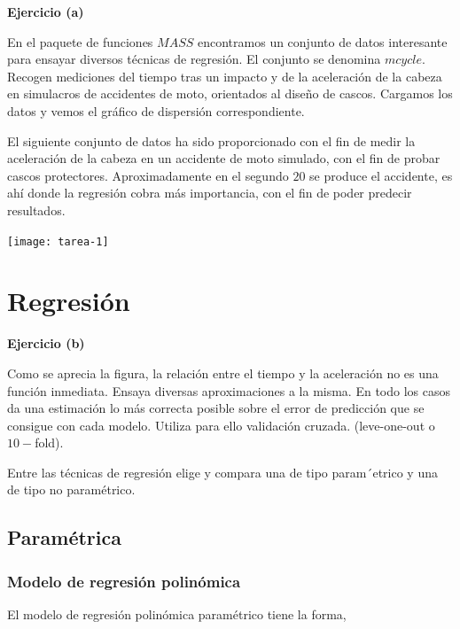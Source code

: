 \documentclass[a4paper,12pt]{article}
\newenvironment{exercise}[1]%
{%
  \par\vspace{\baselineskip}\noindent
  \textbf{Ejercicio (#1)}\begin{itshape}%
  \par\vspace{\baselineskip}\noindent\ignorespaces
}%
{%
  \end{itshape}\ignorespacesafterend
}
\begin{document}
\begin{exercise}{a}

En el paquete de funciones $MASS$ encontramos un conjunto de datos interesante
para ensayar diversos t\'ecnicas de regresi\'on. El conjunto se denomina
$mcycle$. Recogen mediciones del tiempo tras un impacto y de la aceleraci\'on
de la cabeza en simulacros de accidentes de moto, orientados al dise\~no de
cascos. Cargamos los datos y vemos el gr\'afico de dispersi\'on correspondiente.

\end{exercise}

\bigskip

El siguiente conjunto de datos ha sido proporcionado con el fin de medir la aceleración de la cabeza en un accidente de moto simulado, con el fin de probar cascos protectores. Aproximadamente en el segundo $20$ se produce el accidente, es ahí donde la regresión cobra más importancia, con el fin de poder predecir resultados.

\texttt{[image: tarea-1]}

\pagebreak

\section{Regresi\'on}


\begin{exercise}{b}
Como se aprecia la figura, la relaci\'on entre el tiempo y la aceleraci\'on
no es una funci\'on inmediata. Ensaya diversas aproximaciones a la misma.
En todo los casos da una estimaci\'on lo m\'as correcta posible sobre el error de
predicci\'on que se consigue con cada modelo. Utiliza para ello validaci\'on cruzada. (leve-one-out o $10-$fold).

Entre las t\'ecnicas de regresi\'on elige y compara
una de tipo param´etrico y una de tipo no param\'etrico.
\end{exercise}

\subsection{Paramétrica}

\subsubsection{Modelo de regresi\'on polin\'omica}

El modelo de regresión polinómica paramétrico tiene la forma,
\end{document}
